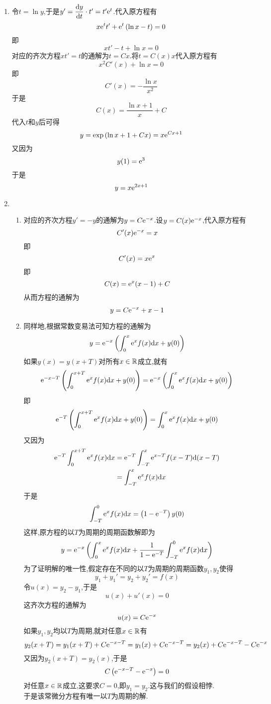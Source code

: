 \documentclass{ctexart}
\begin{document}
\begin{solution}
    \begin{enumerate}[label=\tbf{(\arabic*)}]
        \item 令$t=\ln y$,于是$y'=\dfrac{\mathrm{d} y}{\mathrm{d} t}\cdot t'=t'\mathrm{e}^t$.代入原方程有
            \[x\mathrm{e}^t t'+\mathrm{e}^t\left(\ln x-t\right)=0\]
            即
            \[xt'-t+\ln x=0\]
            对应的齐次方程$xt'=t$的通解为$t=Cx$.将$t=C(x)x$代入原方程有
            \[x^2C'(x)+\ln x=0\]
            即
            \[C'(x)=-\dfrac{\ln x}{x^2}\]
            于是
            \[C(x)=\dfrac{\ln x+1}{x}+C\]
            代入$t$和$y$后可得
            \[y=\exp\left(\ln x+1+Cx\right)=x\mathrm{e}^{Cx+1}\]
            又因为
            \[y(1)=\mathrm{e}^3\]
            于是
            \[y=x\mathrm{e}^{2x+1}\]
        \item 
            \begin{enumerate}[label=\tbf{(\alph*)}]
                \item 对应的齐次方程$y'=-y$的通解为$y=C\mathrm{e}^{-x}$.设$y=C(x)\mathrm{e}^{-x}$,代入原方程有
                    \[C'(x)\mathrm{e}^{-x}=x\]
                    即
                    \[C'(x)=x\mathrm{e}^x\]
                    即
                    \[C(x)=\mathrm{e}^x(x-1)+C\]
                    从而方程的通解为
                    \[y=C\mathrm{e}^{-x}+x-1\]
                \item 同样地,根据常数变易法可知方程的通解为
                    \[y=\mathrm{e}^{-x}\left(\int_0^x\mathrm{e}^xf(x)\mathrm{d} x+y(0)\right)\]
                    如果$y(x)=y(x+T)$对所有$x\in\mathbb{R}$成立,就有
                    \[\mathrm{e}^{-x-T}\left(\int_0^{x+T}\mathrm{e}^xf(x)\mathrm{d} x+y(0)\right)=\mathrm{e}^{-x}\left(\int_0^x\mathrm{e}^xf(x)\mathrm{d} x+y(0)\right)\]
                    即
                    \[\mathrm{e}^{-T}\left(\int_0^{x+T}\mathrm{e}^xf(x)\mathrm{d} x+y(0)\right)=\int_0^x\mathrm{e}^xf(x)\mathrm{d} x+y(0)\]
                    又因为
                    \[\begin{aligned}
                        \mathrm{e}^{-T}\int_0^{x+T}\mathrm{e}^{x}f(x)\mathrm{d} x
                        &= \mathrm{e}^{-T}\int_{-T}^{x}\mathrm{e}^{x-T}f(x-T)\mathrm{d}(x-T) \\
                        &= \int_{-T}^x\mathrm{e}^xf(x)\mathrm{d} x
                    \end{aligned}\]
                    于是
                    \[\int_{-T}^{0}\mathrm{e}^{x}f(x)\mathrm{d} x=\left(1-\mathrm{e}^{-T}\right)y(0)\]
                    这样,原方程的以$T$为周期的周期函数解即为
                    \[y=\mathrm{e}^{-x}\left(\int_0^x\mathrm{e}^xf(x)\mathrm{d} x+\dfrac{1}{1-\mathrm{e}^{-T}}\int_{-T}^0\mathrm{e}^{x}f(x)\mathrm{d} x\right)\]
                    为了证明解的唯一性,假定存在不同的以$T$为周期的周期函数$y_1,y_2$使得
                    \[y_1+y_1'=y_2+y_2'=f(x)\]
                    令$u(x)=y_2-y_1$,于是
                    \[u(x)+u'(x)=0\]
                    这齐次方程的通解为
                    \[u(x)=C\mathrm{e}^{-x}\]
                    如果$y_1,y_2$均以$T$为周期,就对任意$x\in\mathbb{R}$有
                    \[y_2(x+T)=y_1(x+T)+C\mathrm{e}^{-x-T}=y_1(x)+C\mathrm{e}^{-x-T}=y_2(x)+C\mathrm{e}^{-x-T}-C\mathrm{e}^{-x}\]
                    又因为$y_2(x+T)=y_2(x)$,于是
                    \[C\left(\mathrm{e}^{-x-T}-\mathrm{e}^{-x}\right)=0\]
                    对任意$x\in\mathbb{R}$成立,这要求$C=0$,即$y_1=y_2$.这与我们的假设相悖.\\
                    于是该常微分方程有唯一以$T$为周期的解.
            \end{enumerate}
    \end{enumerate}  
\end{solution}
\end{document}
